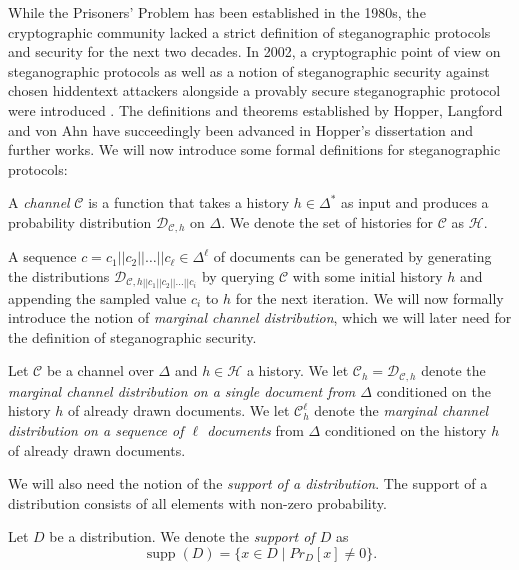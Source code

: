 While the Prisoners' Problem has been established in the 1980s, the cryptographic community lacked a strict definition of steganographic protocols and security for the next two decades.
In 2002, a cryptographic point of view on steganographic protocols as well as a notion of steganographic security against chosen hiddentext attackers alongside a provably secure steganographic protocol were introduced \cite{HLA2002}.
The definitions and theorems established by Hopper, Langford and von Ahn have succeedingly been advanced in Hopper's dissertation \cite{Hopper2004} and further works.
We will now introduce some formal definitions for steganographic protocols:
\begin{definition}[Channel]
A \emph{channel} $\mathcal{C}$ is a function that takes a history $h \in \Delta^*$ as input and produces a probability distribution $\mathcal{D}_{\mathcal{C},h}$ on $\Delta$.
We denote the set of histories for $\mathcal{C}$ as $\mathcal{H}$.
\end{definition}
A sequence $c = c_1||c_2||\dots||c_\ell \in \Delta^\ell$ of documents can be generated by generating the distributions $\mathcal{D}_{\mathcal{C},h||c_1||c_2||\dots||c_i}$ by querying $\mathcal{C}$ with some initial history $h$ and appending the sampled value $c_i$ to $h$ for the next iteration.
We will now formally introduce the notion of \emph{marginal channel distribution}, which we will later need for the definition of steganographic security.
\begin{definition}
Let $\mathcal{C}$ be a channel over $\Delta$ and $h \in \mathcal{H}$ a history.
We let $\mathcal{C}_h = \mathcal{D}_{\mathcal{C},h}$ denote the \emph{marginal channel distribution on a single document from $\Delta$} conditioned on the history $h$ of already drawn documents.
We let $\mathcal{C}_h^\ell$ denote the \emph{marginal channel distribution on a sequence of $\ell$ documents} from $\Delta$ conditioned on the history $h$ of already drawn documents.
\end{definition}
We will also need the notion of the \emph{support of a distribution}.
The support of a distribution consists of all elements with non-zero probability.
\begin{definition}[Support]
Let $D$ be a distribution.
We denote the \emph{support of $D$} as 
$$\mathop{supp}(D) = \{ x \in D \mid Pr_{D}[x] \neq 0 \}.$$
\end{definition}
